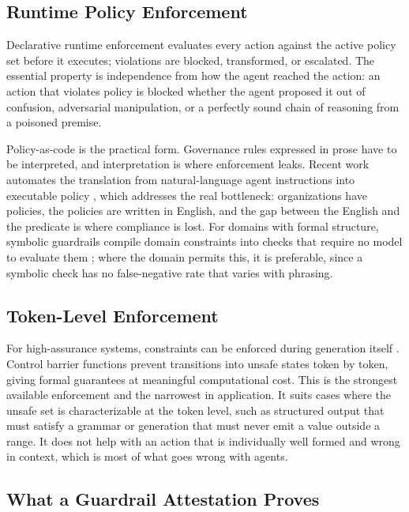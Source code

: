 \documentclass[11pt]{book}
\begin{document}
\subsection{Runtime Policy Enforcement}

Declarative runtime enforcement evaluates every action against the active policy set before it executes; violations are blocked, transformed, or escalated. The essential property is independence from how the agent reached the action: an action that violates policy is blocked whether the agent proposed it out of confusion, adversarial manipulation, or a perfectly sound chain of reasoning from a poisoned premise.

Policy-as-code is the practical form. Governance rules expressed in prose have to be interpreted, and interpretation is where enforcement leaks. Recent work automates the translation from natural-language agent instructions into executable policy \cite{autoformal2026, policyprompt2026}, which addresses the real bottleneck: organizations have policies, the policies are written in English, and the gap between the English and the predicate is where compliance is lost. For domains with formal structure, symbolic guardrails compile domain constraints into checks that require no model to evaluate them \cite{symbolicguard2026}; where the domain permits this, it is preferable, since a symbolic check has no false-negative rate that varies with phrasing.

\subsection{Token-Level Enforcement}

For high-assurance systems, constraints can be enforced during generation itself \cite{callm2025}. Control barrier functions prevent transitions into unsafe states token by token, giving formal guarantees at meaningful computational cost. This is the strongest available enforcement and the narrowest in application. It suits cases where the unsafe set is characterizable at the token level, such as structured output that must satisfy a grammar or generation that must never emit a value outside a range. It does not help with an action that is individually well formed and wrong in context, which is most of what goes wrong with agents.

\subsection{What a Guardrail Attestation Proves}
\end{document}
